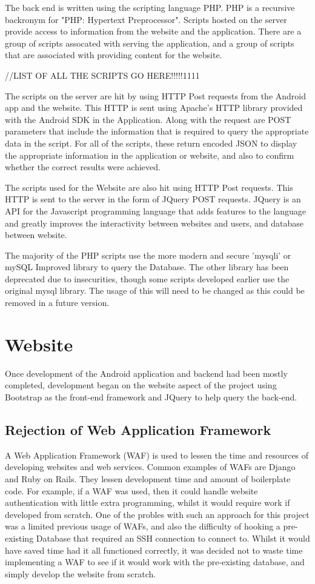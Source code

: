 \documentclass{l4proj}
\begin{document}
The back end is written using the scripting language PHP. PHP is a recursive backronym for "PHP: Hypertext Preprocessor". Scripts hosted on the server provide access to information from the website and the application. There are a group of scripts assocated with serving the application, and a group of scripts that are associated with providing content for the website. 

//LIST OF ALL THE SCRIPTS GO HERE!!!!!1111

The scripts on the server are hit by using HTTP Post requests from the Android app and the website. This HTTP is sent using Apache's HTTP library provided with the Android SDK in the Application. Along with the request are POST parameters that include the information that is required to query the appropriate data in the script. For all of the scripts, these return encoded JSON to display the appropriate information in the application or website, and also to confirm whether the correct results were achieved.

The scripts used for the Website are also hit using HTTP Post requests. This HTTP is sent to the server in the form of JQuery POST requests. JQuery is an API for the Javascript programming language that adds features to the language and greatly improves the interactivity between websites and users, and database between website.

The majority of the PHP scripts use the more modern and secure 'mysqli' or mySQL Improved library to query the Database. The other library has been deprecated due to insecurities, though some scripts developed earlier use the original mysql library. The usage of this will need to be changed as this could be removed in a future version.

\section{Website}

Once development of the Android application and backend had been mostly completed, development began on the website aspect of the project using Bootstrap as the front-end framework and JQuery to help query the back-end.

\subsection{Rejection of Web Application Framework}

A Web Application Framework (WAF) is used to lessen the time and resources of developing websites and web services. Common examples of WAFs are Django and Ruby on Rails. They lessen development time and amount of boilerplate code. For example, if a WAF was used, then it could handle website authentication with little extra programming, whilst it would require work if developed from scratch. One of the probles with such an approach for this project was a limited previous usage of WAFs, and also the difficulty of hooking a pre-existing Database that required an SSH connection to connect to. Whilst it would have saved time had it all functioned correctly, it was decided not to waste time implementing a WAF to see if it would work with the pre-existing database, and simply develop the website from scratch.
\end{document}
